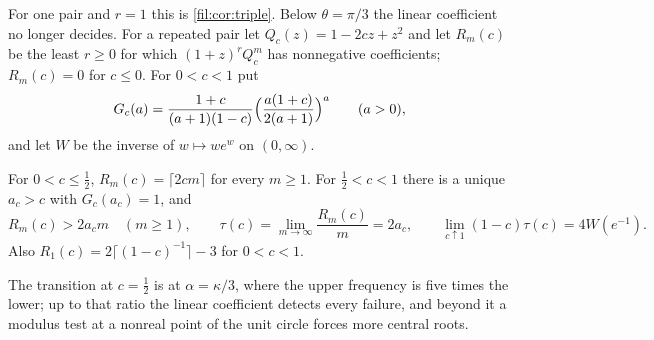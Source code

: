For one pair and $r=1$ this is \cref{fil:cor:triple}. Below $\theta=\pi/3$ the linear coefficient no longer
decides. For a repeated pair let $Q_c(z)=1-2cz+z^2$ and let $R_m(c)$ be the least $r\ge0$ for which
$(1+z)^rQ_c^m$ has nonnegative coefficients; $R_m(c)=0$ for $c\le0$. For $0<c<1$ put
\[
 G_c(a)=\frac{1+c}{(a+1)(1-c)}\Bigl(\frac{a(1+c)}{2(a+1)}\Bigr)^a\qquad(a>0),
\]
and let $W$ be the inverse of $w\mapsto we^w$ on $(0,\infty)$.

\begin{theorem}\label{fil:thm:centralphase}
For $0<c\le\tfrac12$, $R_m(c)=\lceil2cm\rceil$ for every $m\ge1$. For $\tfrac12<c<1$ there is a unique
$a_c>c$ with $G_c(a_c)=1$, and
\[
 R_m(c)>2a_cm\quad(m\ge1),\qquad \tau(c)=\lim_{m\to\infty}\frac{R_m(c)}m=2a_c,\qquad
 \lim_{c\uparrow1}(1-c)\tau(c)=4W(e^{-1}).
\]
Also $R_1(c)=2\lceil(1-c)^{-1}\rceil-3$ for $0<c<1$.
\end{theorem}

The transition at $c=\tfrac12$ is at $\alpha=\kappa/3$, where the upper frequency is five times the lower; up
to that ratio the linear coefficient detects every failure, and beyond it a modulus test at a nonreal point
of the unit circle forces more central roots.

